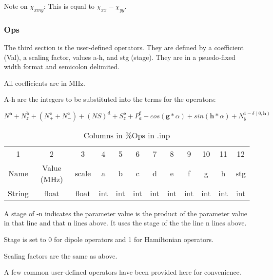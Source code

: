 \documentclass{article}
\begin{document}
Note on $\chi_{xmy}$: This is equal to $\chi_{xx} - \chi_{yy}$.

\FloatBarrier

\subsubsection{Ops}

The third section is the user-defined operators. They are defined by a coefficient (Val), a scaling factor, values a-h, and stg (stage). They are in a psuedo-fixed width format and semicolon delimited.

All coefficients are in MHz.

A-h are the integers to be substituted into the terms for the operators:


	$N^{\textbf{a}} + N_z^\textbf{b} + (N_+^\textbf{c} + N_-^\textbf{c}) + (NS)^\textbf{d} + S_z^\textbf{e} + P_a^\textbf{f} + cos(\textbf{g}*\alpha) + sin(\textbf{h}*\alpha) + N_y^{1-\delta(0,\textbf{h})} $

\begin{table}[h]
	\caption{Columns in \%Ops in .inp}
\begin{tabular}{c c c c c c c c c c c c}
	\hline
	1 & 2 & 3 & 4 & 5 & 6 & 7 & 8 & 9 & 10 & 11 & 12 \\
	Name & Value (MHz) & scale & a & b & c & d & e & f & g & h & stg \\
	String & float & float & int & int & int & int & int & int & int & int & int \\
\end{tabular}
\end{table}


A stage of -n indicates the parameter value is the product of the parameter value in that line and that n lines above. It uses the stage of the the line n lines above. 

Stage is set to 0 for dipole operators and 1 for Hamiltonian operators.

Scaling factors are the same as above.

A few common user-defined operators have been provided here for convenience. 
\end{document}
